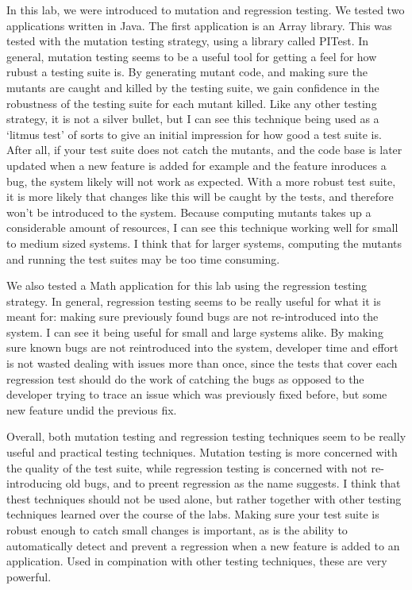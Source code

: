 In this lab, we were introduced to mutation and regression testing.  We tested
two applications written in Java. The first application is an Array library.
This was tested with the mutation testing strategy, using a library called
PITest. 
In general, mutation testing seems to be a useful tool for getting a feel for
how rubust a testing suite is. By generating mutant code, and making sure the
mutants are caught and killed by the testing suite, we gain confidence in the
robustness of the testing suite for each mutant killed. Like any other testing
strategy, it is not a silver bullet, but I can see this technique being used as
a `litmus test' of sorts to give an initial impression for how good a test suite
is. After all, if your test suite does not catch the mutants, and the code base
is later updated when a new feature is added for example and the feature
inroduces a bug, the system likely will not work as expected. With a more robust
test suite, it is more likely that changes like this will be caught by the
tests, and therefore won't be introduced to the system. Because computing
mutants takes up a considerable amount of resources, I can see this technique
working well for small to medium sized systems. I think that for larger systems,
computing the mutants and running the test suites may be too time consuming.

We also tested a Math application for this lab using the regression testing
strategy. In general, regression testing seems to be really useful for what it
is meant for: making sure previously found bugs are not re-introduced into the
system. I can see it being useful for small and large systems alike. By making
sure known bugs are not reintroduced into the system, developer time and effort
is not wasted dealing with issues more than once, since the tests that cover
each regression test should do the work of catching the bugs as opposed to the
developer trying to trace an issue which was previously fixed before, but some
new feature undid the previous fix. 

Overall, both mutation testing and regression testing techniques seem to be
really useful and practical testing techniques. Mutation testing is more
concerned with the quality of the test suite, while regression testing is
concerned with not re-introducing old bugs, and to preent regression as the name
suggests. I think that thest techniques should not be used alone, but rather
together with other testing techniques learned over the course of the labs.
Making sure your test suite is robust enough to catch small changes is
important, as is the ability to automatically detect and prevent a regression
when a new feature is added to an application. Used in compination with other
testing techniques, these are very powerful. 
